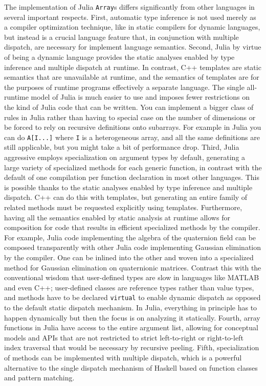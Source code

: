 \documentclass[preprint]{sigplanconf}
\newcommand{\MATLAB}{\textsc{MATLAB}}
\newcommand{\code}[1]{\texttt{#1}}
\begin{document}
The implementation of Julia \code{Array}s differs significantly from other
languages in several important respects. First, automatic type inference is
not used merely as a compiler optimization technique, like in static compilers
for dynamic languages, but instead is a crucial language feature that, in
conjunction with multiple dispatch, are necessary for implement language
semantics. Second, Julia by virtue of being a dynamic language provides the
static analyses enabled by type inference and multiple dispatch at runtime. In
contrast, C++ templates are static semantics that are
unavailable at runtime, and the semantics of templates are for the purposes of
runtime programs effectively a separate language. The single all- runtime
model of Julia is much easier to use and imposes fewer restrictions on the
kind of Julia code that can be written. You can implement a bigger class of
rules in Julia rather than having to special case on the number of dimensions
or be forced to rely on recursive definitions onto subarrays. For example in
Julia you can do \code{A[I...]} where \code{I} is a heterogeneous array, and
all the same definitions are still applicable, but you might take a bit of
performance drop. Third, Julia aggressive employs specialization on argument
types by default, generating a large variety of specialized methods for each
generic function, in contrast with the default of one compilation per function
declaration in most other languages. This is possible thanks to the static
analyses enabled by type inference and multiple dispatch. C++ can do this with
templates, but generating an entire family of related methods must be
requested explicitly using templates. Furthermore, having all the semantics
enabled by static analysis at runtime allows for composition for code that
results in efficient specialized methods by the compiler. For example, Julia
code implementing the algebra of the quaternion field can be composed
transparently with other Julia code implementing Gaussian elimination by the
compiler. One can be inlined into the other and woven into a specialized
method for Gaussian elimination on quaternionic matrices. Contrast this with
the conventional wisdom that user-defined types are slow in languages like
\MATLAB{} and even C++; user-defined classes are reference types rather than
value types, and methods have to be declared \code{virtual} to enable dynamic
dispatch as opposed to the default static dispatch mechanism. In Julia,
everything in principle has to happen dynamically but then the focus is on
analyzing it statically. Fourth, array functions in Julia have access to the
entire argument list, allowing for conceptual models and APIs that are not
restricted to strict left-to-right or right-to-left index traversal that would
be necessary by recursive peeling. Fifth, specialization of methods can be
implemented with multiple dispatch, which is a powerful alternative to the
single dispatch mechanism of Haskell based on function classes and pattern
matching.
\end{document}
